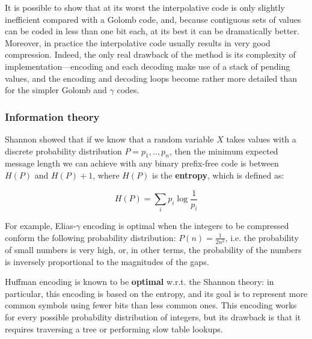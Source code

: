 It is possible to show that at its worst the interpolative code is only slightly inefficient compared with a Golomb code, and, because contiguous sets of values can be coded in less than one bit each, at its best it can be dramatically better. Moreover, in practice the interpolative code usually results in very good compression. Indeed, the only real drawback of the method is its complexity of implementation—encoding and each decoding make use of a stack of pending values, and the encoding and decoding loops become rather more detailed than for the simpler Golomb and $\gamma$ codes.

\subsubsection{Information theory}
Shannon showed that if we know that a random variable $X$ takes values with a discrete probability distribution $P = p_1, .., p_n$, then the minimum expected message length we can achieve with any binary prefix-free code is between $H(P)$ and $H(P) + 1$, where $H(P)$ is the \textbf{entropy}, which is defined as:

$$
H(P) = \sum_i p_i \log \frac{1}{p_i}
$$

For example, Elias-$\gamma$ encoding is optimal when the integers to be compressed conform the following probability distribution: $P(n) = \frac{1}{2n^2}$, i.e. the probability of small numbers is very high, or, in other terms, the probability of the numbers is inversely proportional to the magnitudes of the gaps.

Huffman encoding is known to be \textbf{optimal} w.r.t. the Shannon theory: in particular, this encoding is based on the entropy, and its goal is to represent more common symbols using fewer bits than less common ones. This encoding works for every possible probability distribution of integers, but its drawback is that it requires traversing a tree or performing slow table lookups.
